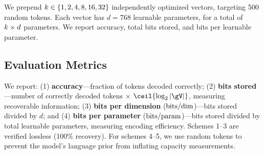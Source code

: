  We prepend $k \in \{1, 2, 4, 8, 16, 32\}$ independently optimized \memvec vectors, targeting 500 random tokens. Each vector has $d = 768$ learnable parameters, for a total of $k \times d$ parameters. We report accuracy, total bits stored, and bits per learnable parameter.

\subsection{Evaluation Metrics}

We report: (1) \textbf{accuracy}---fraction of tokens decoded correctly; (2) \textbf{bits stored}---number of correctly decoded tokens $\times$ $\ceil{\log_2 \vocabsize}$, measuring recoverable information; (3) \textbf{bits per dimension} ($\mathrm{bits/dim}$)---bits stored divided by $d$; and (4) \textbf{bits per parameter} ($\mathrm{bits/param}$)---bits stored divided by total learnable parameters, measuring encoding efficiency. Schemes 1--3 are verified lossless (100\% recovery). For schemes 4--5, we use random tokens to prevent the model's language prior from inflating capacity measurements.
